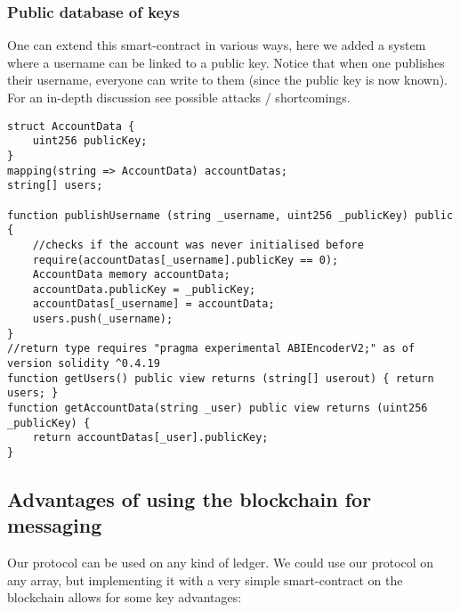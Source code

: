 \documentclass[a4paper]{article} %
\begin{document}
\subsubsection{Public database of keys}
One can extend this smart-contract in various ways, here we added a system where a username can be linked to a public key. Notice that when one publishes their username, everyone can write to them (since the public key is now known). For an in-depth discussion see possible attacks / shortcomings.
\noindent
\begin{lstlisting}
struct AccountData {
    uint256 publicKey;
}
mapping(string => AccountData) accountDatas;
string[] users;

function publishUsername (string _username, uint256 _publicKey) public {
    //checks if the account was never initialised before
    require(accountDatas[_username].publicKey == 0);
    AccountData memory accountData;
    accountData.publicKey = _publicKey;
    accountDatas[_username] = accountData;
    users.push(_username);
}
//return type requires "pragma experimental ABIEncoderV2;" as of version solidity ^0.4.19
function getUsers() public view returns (string[] userout) { return users; }
function getAccountData(string _user) public view returns (uint256 _publicKey) { 
    return accountDatas[_user].publicKey;
}
\end{lstlisting}

\subsection{Advantages of using the blockchain for messaging}
Our protocol can be used on any kind of ledger. We could use our protocol on any array, but implementing it with a very simple smart-contract on the blockchain allows for some key advantages:
\end{document}
